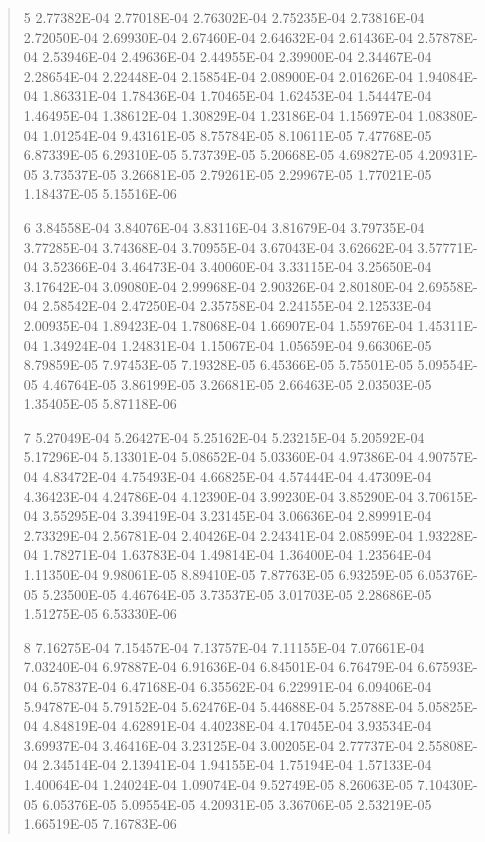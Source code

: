 \documentclass[letterpaper,10pt,english]{sphinxmanual}
\begin{document}
\begin{quote}
\begin{DUlineblock}{0em}
\begin{DUlineblock}{\DUlineblockindent}
\item[] 5   2.77382E-04  2.77018E-04  2.76302E-04  2.75235E-04  2.73816E-04  2.72050E-04  2.69930E-04  2.67460E-04  2.64632E-04  2.61436E-04  2.57878E-04  2.53946E-04  2.49636E-04  2.44955E-04  2.39900E-04  2.34467E-04  2.28654E-04  2.22448E-04  2.15854E-04  2.08900E-04  2.01626E-04  1.94084E-04  1.86331E-04  1.78436E-04  1.70465E-04  1.62453E-04  1.54447E-04  1.46495E-04  1.38612E-04  1.30829E-04  1.23186E-04  1.15697E-04  1.08380E-04  1.01254E-04  9.43161E-05  8.75784E-05  8.10611E-05  7.47768E-05  6.87339E-05  6.29310E-05  5.73739E-05  5.20668E-05  4.69827E-05  4.20931E-05  3.73537E-05  3.26681E-05  2.79261E-05  2.29967E-05  1.77021E-05  1.18437E-05  5.15516E-06
\item[] 6   3.84558E-04  3.84076E-04  3.83116E-04  3.81679E-04  3.79735E-04  3.77285E-04  3.74368E-04  3.70955E-04  3.67043E-04  3.62662E-04  3.57771E-04  3.52366E-04  3.46473E-04  3.40060E-04  3.33115E-04  3.25650E-04  3.17642E-04  3.09080E-04  2.99968E-04  2.90326E-04  2.80180E-04  2.69558E-04  2.58542E-04  2.47250E-04  2.35758E-04  2.24155E-04  2.12533E-04  2.00935E-04  1.89423E-04  1.78068E-04  1.66907E-04  1.55976E-04  1.45311E-04  1.34924E-04  1.24831E-04  1.15067E-04  1.05659E-04  9.66306E-05  8.79859E-05  7.97453E-05  7.19328E-05  6.45366E-05  5.75501E-05  5.09554E-05  4.46764E-05  3.86199E-05  3.26681E-05  2.66463E-05  2.03503E-05  1.35405E-05  5.87118E-06
\item[] 7   5.27049E-04  5.26427E-04  5.25162E-04  5.23215E-04  5.20592E-04  5.17296E-04  5.13301E-04  5.08652E-04  5.03360E-04  4.97386E-04  4.90757E-04  4.83472E-04  4.75493E-04  4.66825E-04  4.57444E-04  4.47309E-04  4.36423E-04  4.24786E-04  4.12390E-04  3.99230E-04  3.85290E-04  3.70615E-04  3.55295E-04  3.39419E-04  3.23145E-04  3.06636E-04  2.89991E-04  2.73329E-04  2.56781E-04  2.40426E-04  2.24341E-04  2.08599E-04  1.93228E-04  1.78271E-04  1.63783E-04  1.49814E-04  1.36400E-04  1.23564E-04  1.11350E-04  9.98061E-05  8.89410E-05  7.87763E-05  6.93259E-05  6.05376E-05  5.23500E-05  4.46764E-05  3.73537E-05  3.01703E-05  2.28686E-05  1.51275E-05  6.53330E-06
\item[] 8   7.16275E-04  7.15457E-04  7.13757E-04  7.11155E-04  7.07661E-04  7.03240E-04  6.97887E-04  6.91636E-04  6.84501E-04  6.76479E-04  6.67593E-04  6.57837E-04  6.47168E-04  6.35562E-04  6.22991E-04  6.09406E-04  5.94787E-04  5.79152E-04  5.62476E-04  5.44688E-04  5.25788E-04  5.05825E-04  4.84819E-04  4.62891E-04  4.40238E-04  4.17045E-04  3.93534E-04  3.69937E-04  3.46416E-04  3.23125E-04  3.00205E-04  2.77737E-04  2.55808E-04  2.34514E-04  2.13941E-04  1.94155E-04  1.75194E-04  1.57133E-04  1.40064E-04  1.24024E-04  1.09074E-04  9.52749E-05  8.26063E-05  7.10430E-05  6.05376E-05  5.09554E-05  4.20931E-05  3.36706E-05  2.53219E-05  1.66519E-05  7.16783E-06

\end{DUlineblock}
\end{DUlineblock}
\end{quote}
\end{document}
